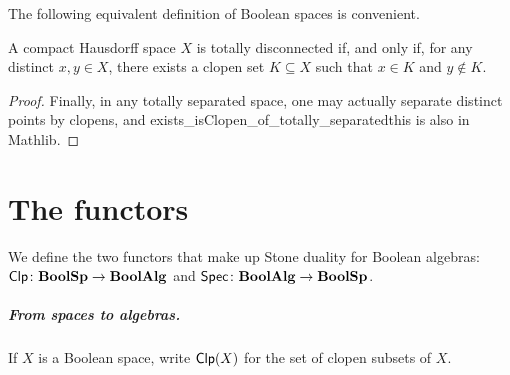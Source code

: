 The following equivalent definition of Boolean spaces is convenient. 

\begin{proposition}\label{BoolSpchar}
    A compact Hausdorff space $X$ is totally disconnected if, and only if, for
    any distinct $x, y \in X$, there exists a clopen set $K \subseteq X$ such
    that $x \in K$ and $y \not\in K$.
\end{proposition}

\begin{proof}
    Finally, in any totally separated space, one may actually
   separate distinct points by clopens, and
   {exists_isClopen_of_totally_separated}{this is also in Mathlib}.
\end{proof}
\chapter{The functors}
We define the two functors that make up Stone duality for Boolean algebras:
$\operatorname*{\mathsf{Clp}} \colon \mathbf{BoolSp} \to \mathbf{BoolAlg}$ and $\operatorname*{\mathsf{Spec}} \colon \mathbf{BoolAlg} \to \mathbf{BoolSp}$.

\paragraph{From spaces to algebras.}
If $X$ is a Boolean space, write $\operatorname*{\mathsf{Clp}}(X)$ for the set of clopen
subsets of $X$. 

